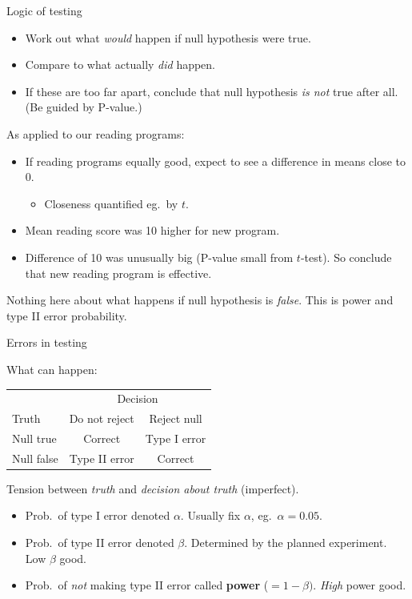 \documentclass[unknownkeysallowed]{beamer}\usepackage[]{graphicx}\usepackage[]{color}
\begin{document}
\begin{frame}{Logic of testing}

  \begin{itemize}
  \item Work out what \emph{would} happen if null hypothesis were true.
  \item Compare to what actually \emph{did} happen.
  \item If these are too far apart, conclude that null hypothesis
    \emph{is not} true after all. (Be guided by P-value.)
  \end{itemize}

As applied to our reading programs:

\begin{itemize}
\item If reading programs equally good, expect to see a difference in
  means close to 0. 
  \begin{itemize}
  \item Closeness quantified eg.\ by $t$.
  \end{itemize}
\item Mean reading score was 10 higher for new program.
\item Difference of 10 was unusually big (P-value small from
  $t$-test). So conclude that new reading program is effective.
\end{itemize}

Nothing here about what happens if null hypothesis is
\emph{false}. This is power and type II error probability.
  
\end{frame}

\begin{frame}{Errors in testing}

What can happen:

\bigskip

\begin{center}
\begin{tabular}{|l|cc|}
\hline
  & \multicolumn{2}{c|}{Decision}\\
Truth & Do not reject & Reject null\\
\hline
Null true & Correct & Type I error\\
Null false & Type II error & Correct\\
\hline
\end{tabular}  
\end{center}

\bigskip

Tension between \emph{truth} and \emph{decision about truth}
(imperfect). 

\begin{itemize}
\item Prob.\ of type I error denoted $\alpha$. Usually fix $\alpha$,
  eg.\ $\alpha=0.05$.
\item Prob.\ of type II error denoted $\beta$. Determined by the planned
  experiment. Low $\beta$ good.
\item Prob.\ of \emph{not} making type II error called \textbf{power}
  ($=1-\beta)$. \emph{High} power good.
\end{itemize}
  
\end{frame}
\end{document}
